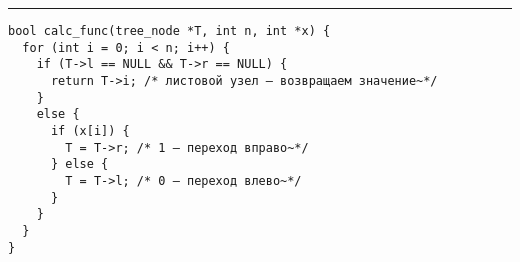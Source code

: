 \documentclass{article}
\begin{document}
\lstset{language = C,
    extendedchars = \true,
    keepspaces = true,
    breaklines=true,
    frame=lines}
\hrule
\begin{lstlisting}[title=\textbf {Алгоритм 3.5} Вычисление значения функции по сокращённому дереву решений]
bool calc_func(tree_node *T, int n, int *x) {
  for (int i = 0; i < n; i++) {
    if (T->l == NULL && T->r == NULL) {
      return T->i; /* листовой узел — возвращаем значениe~*/
    }
    else {
      if (x[i]) {
        T = T->r; /* 1 — переход вправо~*/
      } else {
        T = T->l; /* 0 — переход влево~*/
      }
    }
  }
}
\end{lstlisting}
\end{document}
